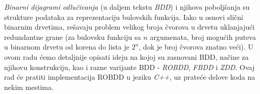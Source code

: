\emph{Binarni dijagrami odlu\v{c}ivanja} (u daljem tekstu \emph{BDD}) i njihova pobolj\v{s}anja su strukture podataka za reprezentaciju bulovskih funkcija. Iako u osnovi sli\v{c}ni binarnim drvetima, re\v{s}avaju problem velikog broja \v{c}vorova u drvetu uklanjaju\'c{}i redundantne grane (za bulovsku funkciju sa $n$ argumenata, broj mogu\'c{}ih puteva u binarnom drvetu od korena do lista je $2^{n}$, dok je broj \v{c}vorova znatno ve\'c{}i). U ovom radu \'c{}emo detaljnije opisati ideju na kojoj su zasnovani BDD, na\v{c}ine za njihovu konstrukciju, kao i razne varijante BDD - \emph{ROBDD}, \emph{FBDD} i \emph{ZDD}. Ovaj rad \'c{}e pratiti implementacija ROBDD u jeziku \emph{C++}, uz prate\'c{}e delove koda na nekim mestima.
